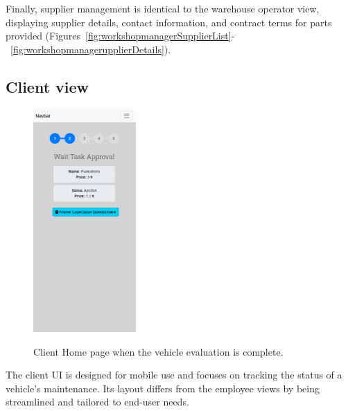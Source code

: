 Finally, supplier management is identical to the warehouse operator view, displaying supplier details, contact information, and contract terms for parts provided (Figures~\ref{fig:workshopmanagerSupplierList}-~\ref{fig:workshopmanagerupplierDetails}).



\subsection{Client view}

\begin{figure}[h]
  \caption{Client Home page when the vehicle evaluation is complete.}
  \centering
  \includegraphics[width=0.35\textwidth]{figs/Implementation/client/MaintenanceState2}
  \label{fig:MaintenanceState2}
\end{figure}


The client \ac{UI} is designed for mobile use and focuses on tracking the status of a vehicle's maintenance. Its layout differs from the employee views by being streamlined and tailored to end-user needs.




